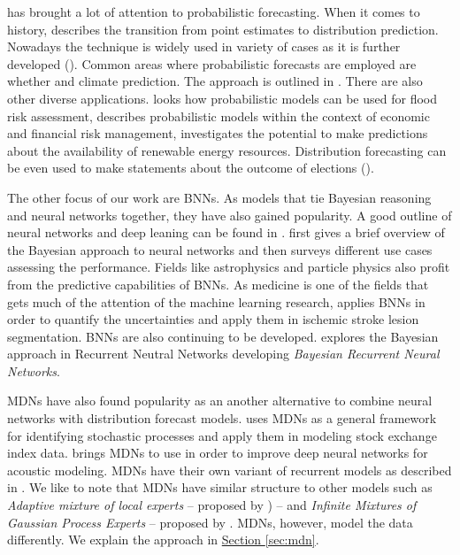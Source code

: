 \documentclass[12pt,a4paper,twoside]{scrartcl}
\numberwithin{equation}{section}
\newcommand{\refsec}[1]{\hyperref[#1]{Section \ref*{#1}}}
\begin{document}
\cite{gneiting2014} has brought a lot of attention to probabilistic forecasting. When it comes to history, \cite{stigler1975} describes the transition from point estimates to distribution prediction. Nowadays the technique is widely used in variety of cases as it is further developed (\cite{ehm2012}). Common areas where probabilistic forecasts are employed are whether and climate prediction. The approach is outlined in \cite{collins2007}. There are also other diverse applications. \cite{krzysztofowic2001} looks how probabilistic models can be used for flood risk assessment, \cite{timmermann2001} describes probabilistic models within the context of economic and financial risk management, \cite{pinson2013} investigates the potential to make predictions about the availability of renewable energy resources. Distribution forecasting can be even used to make statements about the outcome of elections (\cite{montgomery2012}).

The other focus of our work are BNNs. As models that tie Bayesian reasoning and neural networks together, they have also gained popularity. A good outline of neural networks and deep leaning can be found in \cite{schmidhuber2015}. \cite{vehtari2001} first gives a brief overview of the Bayesian approach to neural networks and then surveys different use cases assessing the performance. Fields like astrophysics \cite{bai2016} and particle physics \cite{bhat2015} also profit from the predictive capabilities of BNNs. As medicine is one of the fields that gets much of the attention of the machine learning research, \cite{kwon2017} applies BNNs in order to quantify the uncertainties and apply them in ischemic stroke lesion segmentation. BNNs are also continuing to be developed. \cite{fortunato2017} explores the Bayesian approach in Recurrent Neutral Networks developing \emph{Bayesian Recurrent Neural Networks}.

MDNs have also found popularity as an another alternative to combine neural networks with distribution forecast models. \cite{schittenkopf1998} uses MDNs as a general framework for identifying stochastic processes and apply them in modeling stock exchange index data. \cite{zen2014} brings MDNs to use in order to improve deep neural networks for acoustic modeling. MDNs have their own variant of recurrent models as described in \cite{miazhynskaia2003}. We like to note that MDNs have similar structure to other models such as \emph{Adaptive mixture of local experts} -- proposed by \cite{jacobs1991}) -- and \emph{Infinite Mixtures of Gaussian Process Experts} -- proposed by \cite{rasmussen2002}. MDNs, however, model the data differently. We explain the approach in \refsec{sec:mdn}.
\end{document}
